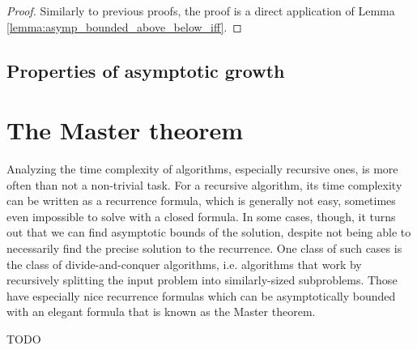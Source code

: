 \begin{proof}
    \leanok
    Similarly to previous proofs, the proof is a direct application of Lemma 
    \ref{lemma:asymp_bounded_above_below_iff}.
\end{proof}


\subsection{Properties of asymptotic growth}



\section{The Master theorem}

Analyzing the time complexity of algorithms, especially recursive ones, is more often 
than not a non-trivial task. For a recursive algorithm, its time complexity can be 
written as a recurrence formula, which is generally not easy, sometimes even impossible 
to solve with a closed formula. In some cases, though, it turns out that we can find 
asymptotic bounds of the solution, despite not being able to necessarily find the 
precise solution to the recurrence. One class of such cases is the class of 
divide-and-conquer algorithms, i.e. algorithms that work by recursively splitting the input 
problem into similarly-sized subproblems. Those have especially nice recurrence formulas 
which can be asymptotically bounded with an elegant formula that is known as the Master theorem.

\begin{theorem}
TODO
\end{theorem}
